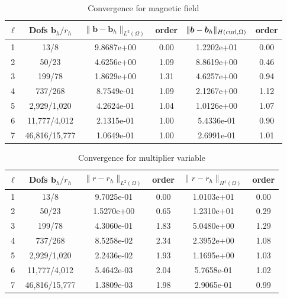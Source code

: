 \documentclass{article}
\newcommand{\uu}[1]{\boldsymbol #1}
\begin{document}
\begin{table}[h!]
\begin{center}
\begin{tabular}{cccccc}
\hline
$\ell$ &    Dofs $\uu{b}_h/r_h$ & $\|\uu{b}-\uu{b}_h\|_{L^2(\Omega)}$ & order & $\|\uu{b}-\uu{b}_h\|_{H({\rm curl},\Omega)}$ & order \\
\hline
1 &     13/8 &  9.8687e+00 &     0.00 &  1.2202e+01 &        0.00 \\
2 &     50/23 &  4.6256e+00 &     1.09 &  8.8619e+00 &        0.46 \\
3 &    199/78 &  1.8629e+00 &     1.31 &  4.6257e+00 &        0.94 \\
4 &    737/268 &  8.7549e-01 &     1.09 &  2.1267e+00 &        1.12 \\
5 &   2,929/1,020 &  4.2624e-01 &     1.04 &  1.0126e+00 &        1.07 \\
6 &  11,777/4,012 &  2.1315e-01 &     1.00 &  5.4336e-01 &        0.90 \\
7 &  46,816/15,777 &  1.0649e-01 &     1.00 &  2.6991e-01 &        1.01 \\
\hline
\end{tabular}
\caption{Convergence for magnetic field}
\label{tab:2D_maxwell_magnetic}
\end{center}
\end{table}
\begin{table}[h!]
\begin{center}
\begin{tabular}{cccccc}
\hline
$\ell$ &    Dofs $\uu{b}_h/r_h$ & $\|{r}-{r}_h\|_{L^2(\Omega)}$ & order & $\|{r}-{r}_h\|_{H^1(\Omega)}$ & order\\
\hline
 1 &      13/8 &     9.7025e-01 &     0.00 &  1.0103e+01 &     0.00 \\
 2 &     50/23 &     1.5270e+00 &     0.65 &  1.2310e+01 &     0.29 \\
 3 &     199/78 &     4.3060e-01 &     1.83 &  5.0480e+00 &     1.29 \\
 4 &    737/268 &     8.5258e-02 &     2.34 &  2.3952e+00 &     1.08 \\
 5 &   2,929/1,020 &    2.2436e-02 &     1.93 &  1.1695e+00 &     1.03 \\
 6 &   11,777/4,012 &    5.4642e-03 &     2.04 &  5.7658e-01 &     1.02 \\
 7 &  46,816/15,777 &  1.3809e-03 &     1.98 &  2.9065e-01 &     0.99 \\

\hline
\end{tabular}
\caption{Convergence for  multiplier variable}
\label{tab:2D_maxwell_multiplier}

\end{center}
\end{table}
\end{document}
